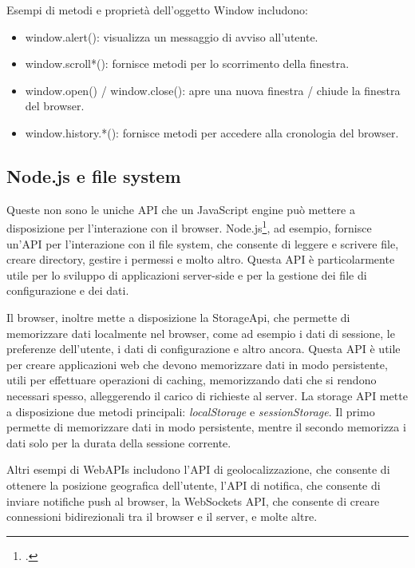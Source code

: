 Esempi di metodi e proprietà dell'oggetto Window includono:
\begin{itemize}
    \item window.alert(): visualizza un messaggio di avviso all'utente.
    \item window.scroll*(): fornisce metodi per lo scorrimento della finestra.
    \item window.open() / window.close(): apre una nuova finestra / chiude la finestra del browser.
    \item window.history.*(): fornisce metodi per accedere alla cronologia del browser.
\end{itemize}

\subsection{Node.js e file system}
Queste non sono le uniche API che un JavaScript engine può mettere a disposizione per l'interazione con il browser.
Node.js\footcite{nodejs}, ad esempio, fornisce un'API per l'interazione con il file system, che consente di leggere e scrivere file,
creare directory, gestire i permessi e molto altro. Questa API è particolarmente utile per lo sviluppo di applicazioni
server-side e per la gestione dei file di configurazione e dei dati.
 
Il browser, inoltre mette a disposizione la StorageApi, che permette di memorizzare dati localmente nel browser, come ad
esempio i dati di sessione, le preferenze dell'utente, i dati di configurazione e altro ancora. Questa API è utile per
creare applicazioni web che devono memorizzare dati in modo persistente, utili per effettuare operazioni di caching,
memorizzando dati che si rendono necessari spesso, alleggerendo il carico di richieste al server.
La storage API mette a disposizione due metodi principali: \textit{localStorage} e \textit{sessionStorage}. Il primo
permette di memorizzare dati in modo persistente, mentre il secondo memorizza i dati solo per la durata della sessione
corrente.

Altri esempi di WebAPIs includono l'API di geolocalizzazione, che consente di ottenere la posizione geografica
dell'utente, l'API di notifica, che consente di inviare notifiche push al browser, la WebSockets API, che consente di
creare connessioni bidirezionali tra il browser e il server, e molte altre.
